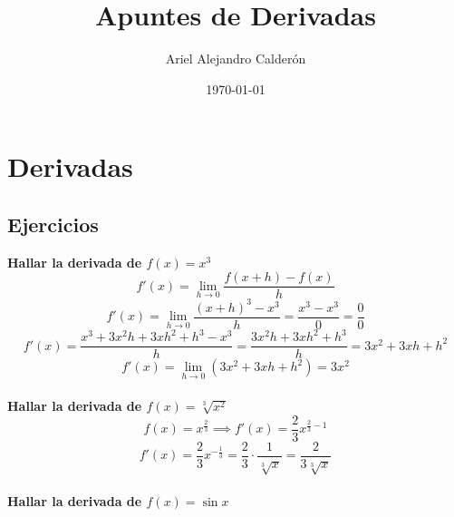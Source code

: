 \documentclass[12pt,a4paper,fleqn]{article}
\title{Apuntes de Derivadas}
\author{Ariel Alejandro Calderón}
\date{\today}
\begin{document}
\maketitle

\newpage
\tableofcontents
\newpage

\section{Derivadas}
\subsection{Ejercicios}

\textbf{Hallar la derivada de $f(x)=x^3$}
\begin{equation*}
    f'(x) = \lim_{h \to 0} \dfrac{f(x+h) - f(x)}{h}
\end{equation*}
\begin{equation*}
    f'(x) = \lim_{h \to 0} \dfrac{(x+h)^3 - x^3}{h} = \dfrac{x^3 - x^3}{0} = \dfrac{0}{0}
\end{equation*}
\begin{equation*}
    f'(x) = \dfrac{x^3 + 3x^2h + 3xh^2 + h^3 - x^3}{h} = \dfrac{3x^2h + 3xh^2 + h^3}{h} = 3x^2 + 3xh + h^2
\end{equation*}
\begin{equation*}
    f'(x) = \lim_{h \to 0} (3x^2 + 3xh + h^2) = 3x^2
\end{equation*}\\[10pt]
\textbf{Hallar la derivada de $f(x)=\sqrt[3]{x^2}$}
\begin{equation*}
    f(x) = x^{\frac{2}{3}} \implies f'(x)= \frac{2}{3}x^{\frac{2}{3}-1}
\end{equation*}
\begin{equation*}
    f'(x)= \frac{2}{3}x^{-\frac{1}{3}}=\frac{2}{3}\cdot\frac{1}{\sqrt[3]{x}}=\frac{2}{3\sqrt[3]{x}}
\end{equation*}\\[10pt]
\textbf{Hallar la derivada de $f(x)= \sin x$}\\[10pt]
\end{document}
